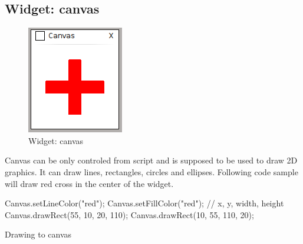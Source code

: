 \documentclass[12pt, a4paper, oneside]{article}
\begin{document}
\subsection{Widget: canvas}
\begin{figure}[H]
\begin{center}
\includegraphics[scale=1]{img/w_canvas.png}
\caption{Widget: canvas}
\end{center}
\end{figure}
Canvas can be only controled from script and is supposed to be used to draw 2D graphics. It can draw lines, rectangles, circles and ellipses. Following code sample will draw red cross in the center of the widget.

\begin{listing}[H]
\begin{jscode}
Canvas.setLineColor("red");
Canvas.setFillColor("red");
// x, y, width, height
Canvas.drawRect(55, 10, 20, 110);
Canvas.drawRect(10, 55, 110, 20);
\end{jscode}
\caption{Drawing to canvas}
\end{listing}
\end{document}
